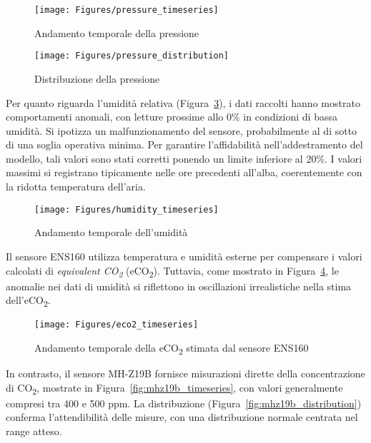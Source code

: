 \documentclass[fleqn,10pt]{SelfArx} %
\begin{document}
\begin{figure}[ht]\centering
	\texttt{[image: Figures/pressure\_timeseries]}
	\caption{Andamento temporale della pressione}
	\label{fig:pressure_timeseries}
\end{figure}

\begin{figure}[ht]\centering
	\texttt{[image: Figures/pressure\_distribution]}
	\caption{Distribuzione della pressione}
	\label{fig:press_dis}
\end{figure}

Per quanto riguarda l’umidità relativa (Figura~\ref{fig:humidity_timeseries}), i dati raccolti hanno mostrato comportamenti anomali, con letture prossime allo 0\% in condizioni di bassa umidità. Si ipotizza un malfunzionamento del sensore, probabilmente al di sotto di una soglia operativa minima. Per garantire l’affidabilità nell’addestramento del modello, tali valori sono stati corretti ponendo un limite inferiore al 20\%. I valori massimi si registrano tipicamente nelle ore precedenti all’alba, coerentemente con la ridotta temperatura dell’aria.

\begin{figure}[ht]\centering
	\texttt{[image: Figures/humidity\_timeseries]}
	\caption{Andamento temporale dell'umidità}
	\label{fig:humidity_timeseries}
\end{figure}

Il sensore ENS160 utilizza temperatura e umidità esterne per compensare i valori calcolati di \textit{equivalent CO\textsubscript{2}} (eCO\textsubscript{2}). Tuttavia, come mostrato in Figura~\ref{fig:ens160_timeseries}, le anomalie nei dati di umidità si riflettono in oscillazioni irrealistiche nella stima dell’eCO\textsubscript{2}.

\begin{figure}[ht]\centering
	\texttt{[image: Figures/eco2\_timeseries]}
	\caption{Andamento temporale della eCO\textsubscript{2} stimata dal sensore ENS160}
	\label{fig:ens160_timeseries}
\end{figure}

In contrasto, il sensore MH-Z19B fornisce misurazioni dirette della concentrazione di CO\textsubscript{2}, mostrate in Figura~\ref{fig:mhz19b_timeseries}, con valori generalmente compresi tra 400 e 500 ppm. La distribuzione (Figura~\ref{fig:mhz19b_distribution}) conferma l’attendibilità delle misure, con una distribuzione normale centrata nel range atteso.
\end{document}
